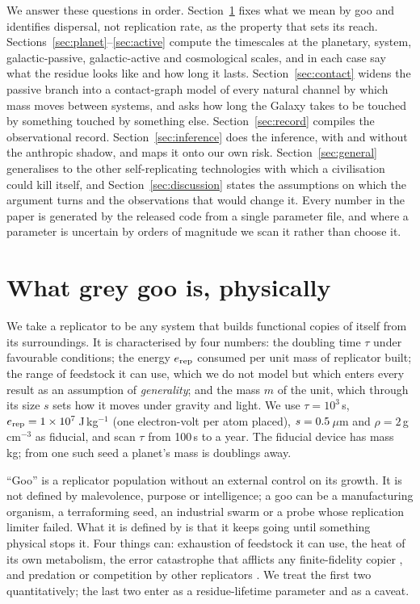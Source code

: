 \documentclass[11pt]{article}
\newcommand{\um}{\ensuremath{\,\mu\mathrm{m}}\xspace}
\begin{document}
We answer these questions in order.  Section~\ref{sec:what} fixes what we mean
by goo and identifies dispersal, not replication rate, as the property that
sets its reach.  Sections~\ref{sec:planet}--\ref{sec:active} compute the
timescales at the planetary, system, galactic-passive, galactic-active and
cosmological scales, and in each case say what the residue looks like and how
long it lasts.  Section~\ref{sec:contact} widens the passive branch into a
contact-graph model of every natural channel by which mass moves between
systems, and asks how long the Galaxy takes to be touched by something touched
by something else.  Section~\ref{sec:record} compiles the observational record.
Section~\ref{sec:inference} does the inference, with and without the anthropic
shadow, and maps it onto our own risk.  Section~\ref{sec:general} generalises
to the other self-replicating technologies with which a civilisation could kill
itself, and Section~\ref{sec:discussion} states the assumptions on which the
argument turns and the observations that would change it.  Every number in
the paper is generated by the released code from a single parameter file, and
where a parameter is uncertain by orders of magnitude we scan it rather than
choose it.

\section{What grey goo is, physically}
\label{sec:what}

We take a replicator to be any system that builds functional copies of itself
from its surroundings.  It is characterised by four numbers: the doubling time
$\tau$ under favourable conditions; the energy $e_{\rm rep}$ consumed per unit
mass of replicator built; the range of feedstock it can use, which we do not
model but which enters every result as an assumption of \emph{generality}; and
the mass $m$ of the unit, which through its size $s$ sets how it moves under
gravity and light.  We use $\tau=10^{3}$\,s, $e_{\rm rep}=1\times10^{7}$\,J\,kg$^{-1}$
(one electron-volt per atom placed), $s=0.5$\um and
$\rho=2$\,g\,cm$^{-3}$ as fiducial, and scan $\tau$ from 100\,s to a year.  The
fiducial device has mass \SeedMassKg\,kg; from one such seed a planet's mass
is \BulkDoublings doublings away.

``Goo'' is a replicator population without an external control on its growth.
It is not defined by malevolence, purpose or intelligence; a goo can be a
manufacturing organism, a terraforming seed, an industrial swarm or a probe
whose replication limiter failed.  What it is defined by is that it keeps
going until something physical stops it.  Four things can: exhaustion of
feedstock it can use, the heat of its own metabolism, the error catastrophe
that afflicts any finite-fidelity copier \citep{Eigen1971,Kowald2015}, and
predation or competition by other replicators \citep{Chen2022}.  We treat the
first two quantitatively; the last two enter as a residue-lifetime parameter
and as a caveat.
\end{document}
